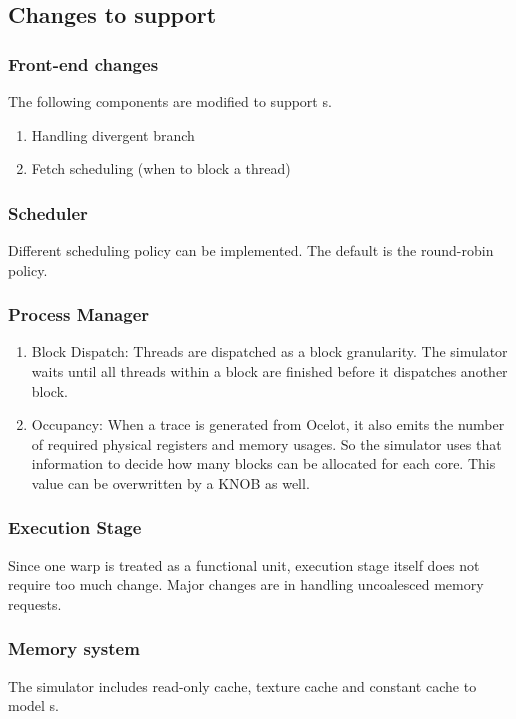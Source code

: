 \ignore
	  {
	  }

\ignore 
		{
		\subsection{Changes to support {\gpu}}
		\subsubsection{Front-end changes}
		The following components are modified to support {\gpu}s. 
		\begin{enumerate}
		\item Handling divergent branch
		\item Fetch scheduling (when to block a thread)
		\end{enumerate}
		\subsubsection{Scheduler}
		Different scheduling policy can be implemented. The default is the round-robin policy. 

		\subsubsection{Process Manager}

		\begin{enumerate}
		\item Block Dispatch: Threads are dispatched as a block granularity. 
		The simulator waits until all threads within a block are finished 
		before it dispatches another block. 
		\item Occupancy: When a trace is generated from Ocelot, it also emits the number of required 
		physical registers and memory usages. So the simulator uses that information to decide 
		how many blocks can be allocated for each core. This value can be overwritten by a KNOB as well. 
		\end{enumerate}

		\subsubsection{Execution Stage}
		Since one warp is treated as a functional unit, execution stage itself does not require too much change. Major changes are in handling uncoalesced memory  requests. 

		\subsubsection{Memory system}
		The simulator includes read-only cache, texture cache and constant cache to model {\gpu}s. 
		}

